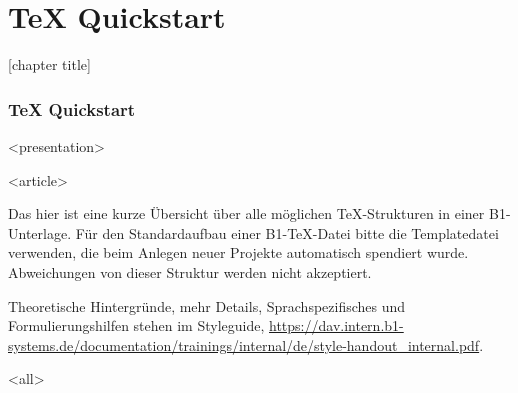 \section{TeX Quickstart}
{%
[chapter title]
\begin{frame}[fragile]
\frametitle<presentation>{TeX Quickstart}




\mode
<presentation>


\mode
<article>

Das hier ist eine kurze Übersicht über alle möglichen TeX-Strukturen in einer B1-Unterlage. Für den Standardaufbau einer B1-TeX-Datei bitte die Templatedatei verwenden, die beim Anlegen neuer Projekte automatisch spendiert wurde. Abweichungen von dieser Struktur werden nicht akzeptiert.

Theoretische Hintergründe, mehr Details, Sprachspezifisches und Formulierungshilfen stehen im Styleguide, \url{https://dav.intern.b1-systems.de/documentation/trainings/internal/de/style-handout\_internal.pdf}.

\mode
<all>

\end{frame}
}

\newpage

